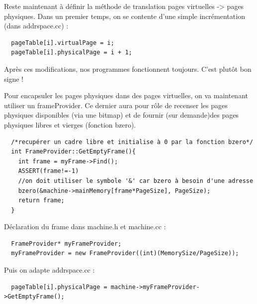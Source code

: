 \documentclass[a4paper,10pt]{report}
\begin{document}
  Reste maintenant à définir la méthode de translation pages virtuelles -> pages physiques. Dans un premier temps, on se contente d'une simple incrémentation (dans addrspace.cc) :

  \begin{lstlisting}
  pageTable[i].virtualPage = i;
  pageTable[i].physicalPage = i + 1;
  \end{lstlisting}

  Après ces modifications, nos programmes fonctionnent toujours. C'est plutôt bon signe !

  Pour encapsuler les pages physiques dans des pages virtuelles, on va maintenant utiliser un frameProvider. Ce dernier aura pour rôle de recenser les pages physiques disponibles (via une bitmap) et de fournir (sur demande)des pages physiques libres et vierges (fonction bzero).

  \begin{lstlisting}
  /*recupérer un cadre libre et initialise à 0 par la fonction bzero*/
  int FrameProvider::GetEmptyFrame(){
    int frame = myFrame->Find();
    ASSERT(frame!=-1)
    //on doit utiliser le symbole '&' car bzero à besoin d'une adresse
    bzero(&machine->mainMemory[frame*PageSize], PageSize);
    return frame;
  }
  \end{lstlisting}
  \newpage
  Déclaration du frame dans machine.h et machine.cc :

  \begin{lstlisting}
  FrameProvider* myFrameProvider;
  myFrameProvider = new FrameProvider((int)(MemorySize/PageSize));
  \end{lstlisting}

  Puis on adapte addrspace.cc :

  \begin{lstlisting}
  pageTable[i].physicalPage = machine->myFrameProvider->GetEmptyFrame();
  \end{lstlisting}
\end{document}
